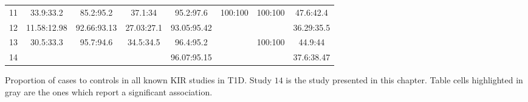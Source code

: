 \begin{table}[h]
\begin{tabularx}{\textwidth}{lccccccc}
11              & 33.9:33.2   & 85.2:95.2   & 37.1:34     & 95.2:97.6   & 100:100     & 100:100    & 47.6:42.4\\
12              & 11.58:12.98 & 92.66:93.13 & 27.03:27.1  & 93.05:95.42 &             &            & 36.29:35.5\\
13              & 30.5:33.3   & 95.7:94.6   & 34.5:34.5   & 96.4:95.2   &             & 100:100    & 44.9:44\\
14              &             &             &             & 96.07:95.15 &             &            & 37.6:38.47\\
\end{tabularx}
{Proportion of cases to controls in all known \gls{KIR} studies in T1D.}
{
  Study $14$ is the study presented in this chapter.
  Table cells highlighted in gray are the ones which report a significant association.
}
\end{table}

